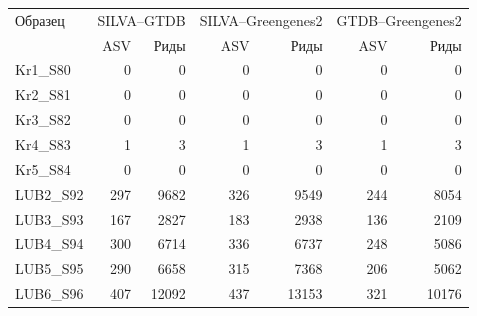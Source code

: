 \begin{tabular}{lrrrrrr}
\toprule
Образец & \multicolumn{2}{c}{SILVA--GTDB} & \multicolumn{2}{c}{SILVA--Greengenes2} & \multicolumn{2}{c}{GTDB--Greengenes2} \\
& ASV & Риды & ASV & Риды & ASV & Риды \\
\midrule
Kr1\_S80 & 0 & 0 & 0 & 0 & 0 & 0 \\
Kr2\_S81 & 0 & 0 & 0 & 0 & 0 & 0 \\
Kr3\_S82 & 0 & 0 & 0 & 0 & 0 & 0 \\
Kr4\_S83 & 1 & 3 & 1 & 3 & 1 & 3 \\
Kr5\_S84 & 0 & 0 & 0 & 0 & 0 & 0 \\
LUB2\_S92 & 297 & 9682 & 326 & 9549 & 244 & 8054 \\
LUB3\_S93 & 167 & 2827 & 183 & 2938 & 136 & 2109 \\
LUB4\_S94 & 300 & 6714 & 336 & 6737 & 248 & 5086 \\
LUB5\_S95 & 290 & 6658 & 315 & 7368 & 206 & 5062 \\
LUB6\_S96 & 407 & 12092 & 437 & 13153 & 321 & 10176 \\
\bottomrule
\end{tabular}
